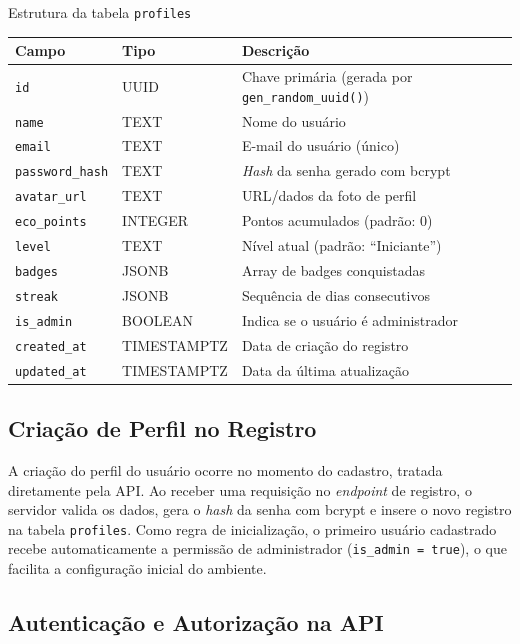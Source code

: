 \documentclass[
	12pt,
	openright,
	oneside,
	a4paper,
	chapter=TITLE,
	section=TITLE,
	subsection=TITLE,
	subsubsection=TITLE,
	english,
	brazil
	]{abntex2}
\begin{document}
\begin{quadro}[htbp]
\caption{Estrutura da tabela \texttt{profiles}}
\label{qua:tabela-profiles}
\begin{tabularx}{\textwidth}{|l|l|L|}
\hline
\textbf{Campo} & \textbf{Tipo} & \textbf{Descrição} \\
\hline
\texttt{id} & UUID & Chave primária (gerada por \texttt{gen\_random\_uuid()}) \\
\hline
\texttt{name} & TEXT & Nome do usuário \\
\hline
\texttt{email} & TEXT & E-mail do usuário (único) \\
\hline
\texttt{password\_hash} & TEXT & \textit{Hash} da senha gerado com bcrypt \\
\hline
\texttt{avatar\_url} & TEXT & URL/dados da foto de perfil \\
\hline
\texttt{eco\_points} & INTEGER & Pontos acumulados (padrão: 0) \\
\hline
\texttt{level} & TEXT & Nível atual (padrão: ``Iniciante'') \\
\hline
\texttt{badges} & JSONB & Array de badges conquistadas \\
\hline
\texttt{streak} & JSONB & Sequência de dias consecutivos \\
\hline
\texttt{is\_admin} & BOOLEAN & Indica se o usuário é administrador \\
\hline
\texttt{created\_at} & TIMESTAMPTZ & Data de criação do registro \\
\hline
\texttt{updated\_at} & TIMESTAMPTZ & Data da última atualização \\
\hline
\end{tabularx}
\end{quadro}

\subsection{Criação de Perfil no Registro}

A criação do perfil do usuário ocorre no momento do cadastro, tratada diretamente pela API. Ao receber uma requisição no \textit{endpoint} de registro, o servidor valida os dados, gera o \textit{hash} da senha com bcrypt e insere o novo registro na tabela \texttt{profiles}. Como regra de inicialização, o primeiro usuário cadastrado recebe automaticamente a permissão de administrador (\texttt{is\_admin = true}), o que facilita a configuração inicial do ambiente.

\subsection{Autenticação e Autorização na API}
\end{document}
